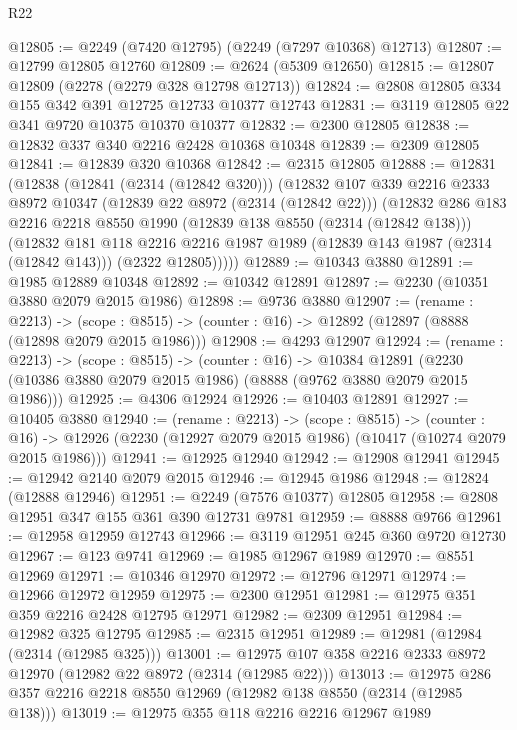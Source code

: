 \begin{lexlean}{R22}
\begin{coremodule}
@12805 := @2249 (@7420 @12795) (@2249 (@7297 @10368) @12713)
@12807 := @12799 @12805 @12760
@12809 := @2624 (@5309 @12650)
@12815 := @12807 @12809 (@2278 (@2279 @328 @12798 @12713))
@12824 := @2808 @12805 @334 @155 @342 @391 @12725 @12733 @10377 @12743
@12831 := @3119 @12805 @22 @341 @9720 @10375 @10370 @10377
@12832 := @2300 @12805
@12838 := @12832 @337 @340 @2216 @2428 @10368 @10348
@12839 := @2309 @12805
@12841 := @12839 @320 @10368
@12842 := @2315 @12805
@12888 := @12831
    (@12838
      (@12841 (@2314 (@12842 @320)))
      (@12832
        @107
        @339
        @2216
        @2333
        @8972
        @10347
        (@12839 @22 @8972 (@2314 (@12842 @22)))
        (@12832
          @286
          @183
          @2216
          @2218
          @8550
          @1990
          (@12839 @138 @8550 (@2314 (@12842 @138)))
          (@12832
            @181
            @118
            @2216
            @2216
            @1987
            @1989
            (@12839 @143 @1987 (@2314 (@12842 @143)))
            (@2322 @12805)))))
@12889 := @10343 @3880
@12891 := @1985 @12889 @10348
@12892 := @10342 @12891
@12897 := @2230 (@10351 @3880 @2079 @2015 @1986)
@12898 := @9736 @3880
@12907 := (rename : @2213) ->
  (scope : @8515) -> (counter : @16) -> @12892 (@12897 (@8888 (@12898 @2079 @2015 @1986)))
@12908 := @4293 @12907
@12924 := (rename : @2213) ->
  (scope : @8515) ->
  (counter : @16) ->
  @10384 @12891 (@2230 (@10386 @3880 @2079 @2015 @1986) (@8888 (@9762 @3880 @2079 @2015 @1986)))
@12925 := @4306 @12924
@12926 := @10403 @12891
@12927 := @10405 @3880
@12940 := (rename : @2213) ->
  (scope : @8515) ->
  (counter : @16) -> @12926 (@2230 (@12927 @2079 @2015 @1986) (@10417 (@10274 @2079 @2015 @1986)))
@12941 := @12925 @12940
@12942 := @12908 @12941
@12945 := @12942 @2140 @2079 @2015
@12946 := @12945 @1986
@12948 := @12824 (@12888 @12946)
@12951 := @2249 (@7576 @10377) @12805
@12958 := @2808 @12951 @347 @155 @361 @390 @12731 @9781
@12959 := @8888 @9766
@12961 := @12958 @12959 @12743
@12966 := @3119 @12951 @245 @360 @9720 @12730
@12967 := @123 @9741
@12969 := @1985 @12967 @1989
@12970 := @8551 @12969
@12971 := @10346 @12970
@12972 := @12796 @12971
@12974 := @12966 @12972 @12959
@12975 := @2300 @12951
@12981 := @12975 @351 @359 @2216 @2428 @12795 @12971
@12982 := @2309 @12951
@12984 := @12982 @325 @12795
@12985 := @2315 @12951
@12989 := @12981 (@12984 (@2314 (@12985 @325)))
@13001 := @12975 @107 @358 @2216 @2333 @8972 @12970 (@12982 @22 @8972 (@2314 (@12985 @22)))
@13013 := @12975 @286 @357 @2216 @2218 @8550 @12969 (@12982 @138 @8550 (@2314 (@12985 @138)))
@13019 := @12975 @355 @118 @2216 @2216 @12967 @1989

\end{coremodule}
\end{lexlean}
